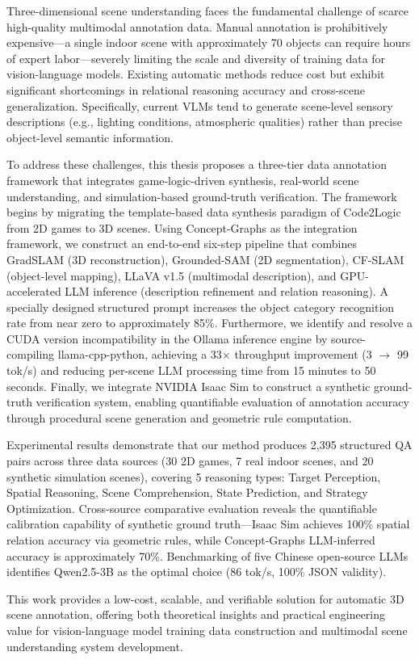 \documentclass[type=bachelor,oneside]{fduthesis}
\begin{document}
\begin{abstract*}
Three-dimensional scene understanding faces the fundamental challenge of scarce high-quality multimodal annotation data. Manual annotation is prohibitively expensive—a single indoor scene with approximately 70 objects can require hours of expert labor—severely limiting the scale and diversity of training data for vision-language models. Existing automatic methods reduce cost but exhibit significant shortcomings in relational reasoning accuracy and cross-scene generalization. Specifically, current VLMs tend to generate scene-level sensory descriptions (e.g., lighting conditions, atmospheric qualities) rather than precise object-level semantic information.

To address these challenges, this thesis proposes a three-tier data annotation framework that integrates game-logic-driven synthesis, real-world scene understanding, and simulation-based ground-truth verification. The framework begins by migrating the template-based data synthesis paradigm of Code2Logic from 2D games to 3D scenes. Using Concept-Graphs as the integration framework, we construct an end-to-end six-step pipeline that combines GradSLAM (3D reconstruction), Grounded-SAM (2D segmentation), CF-SLAM (object-level mapping), LLaVA v1.5 (multimodal description), and GPU-accelerated LLM inference (description refinement and relation reasoning). A specially designed structured prompt increases the object category recognition rate from near zero to approximately 85\%. Furthermore, we identify and resolve a CUDA version incompatibility in the Ollama inference engine by source-compiling llama-cpp-python, achieving a 33$\times$ throughput improvement (3 $\rightarrow$ 99 tok/s) and reducing per-scene LLM processing time from 15 minutes to 50 seconds. Finally, we integrate NVIDIA Isaac Sim to construct a synthetic ground-truth verification system, enabling quantifiable evaluation of annotation accuracy through procedural scene generation and geometric rule computation.

Experimental results demonstrate that our method produces 2,395 structured QA pairs across three data sources (30 2D games, 7 real indoor scenes, and 20 synthetic simulation scenes), covering 5 reasoning types: Target Perception, Spatial Reasoning, Scene Comprehension, State Prediction, and Strategy Optimization. Cross-source comparative evaluation reveals the quantifiable calibration capability of synthetic ground truth—Isaac Sim achieves 100\% spatial relation accuracy via geometric rules, while Concept-Graphs LLM-inferred accuracy is approximately 70\%. Benchmarking of five Chinese open-source LLMs identifies Qwen2.5-3B as the optimal choice (86 tok/s, 100\% JSON validity).

This work provides a low-cost, scalable, and verifiable solution for automatic 3D scene annotation, offering both theoretical insights and practical engineering value for vision-language model training data construction and multimodal scene understanding system development.
\end{abstract*}
\end{document}
